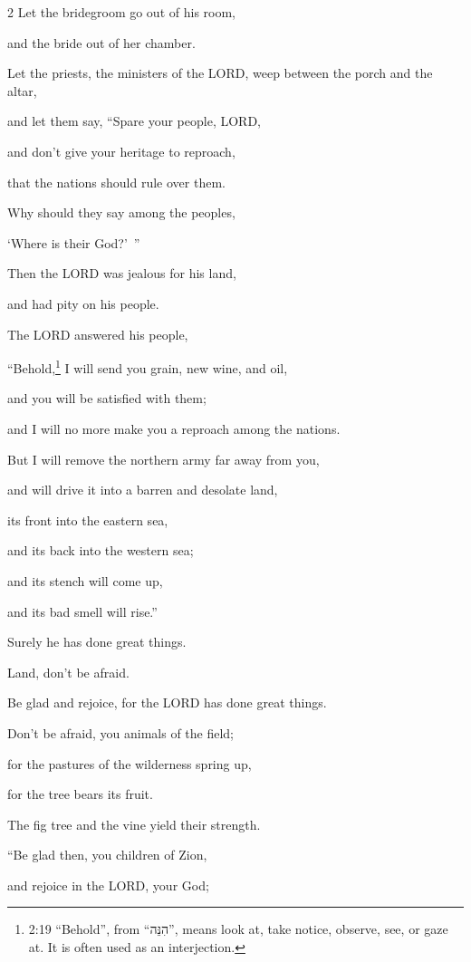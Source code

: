 \begin{multicols}{2}
Let the bridegroom go out of his room,

and the bride out of her chamber.

\myverse{}Let the priests, the ministers of the LORD, weep between the
porch and the altar,

and let them say, “Spare your people, LORD,

and don’t give your heritage to reproach,

that the nations should rule over them.

Why should they say among the peoples,

‘Where is their God?’ ”

\myverse{}Then the LORD was jealous for his land,

and had pity on his people.

\myverse{}The LORD answered his people,

“Behold,\footnote{2:19 “Behold”, from “הִנֵּה”, means look at, take notice, observe, see, or gaze at. It is
	often used as an interjection.} I will send you grain, new wine, and oil,

and you will be satisfied with them;

and I will no more make you a reproach among the nations.

\myverse{}But I will remove the northern army far away from you,

and will drive it into a barren and desolate land,

its front into the eastern sea,

and its back into the western sea;

and its stench will come up,

and its bad smell will rise.”

Surely he has done great things.

\myverse{}Land, don’t be afraid.

Be glad and rejoice, for the LORD has done great things.

\myverse{}Don’t be afraid, you animals of the field;

for the pastures of the wilderness spring up,

for the tree bears its fruit.

The fig tree and the vine yield their strength.


\vspace{\baselineskip} 
\myverse{}“Be glad then, you children of Zion,

and rejoice in the LORD, your God;


\end{multicols}
